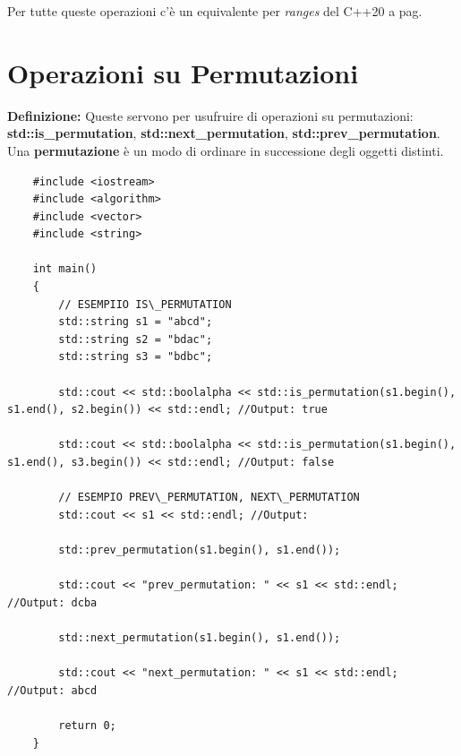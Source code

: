 
\fleuron

\textsf{\small Per tutte queste operazioni c'è un equivalente per \emph{ranges} del C++20 a pag. \pageref{ranges_compare}} \\


\newpage

\section{Operazioni su Permutazioni}

\textsf{\small \textbf{Definizione: } Queste servono per usufruire di operazioni su permutazioni: \textbf{std::is\_permutation}, \textbf{std::next\_permutation}, \textbf{std::prev\_permutation}.} \\

\textsf{\small Una \textbf{permutazione} è un modo di ordinare in successione degli oggetti distinti.} \\

\begin{lstlisting}
	#include <iostream>
	#include <algorithm>
	#include <vector>
	#include <string>
	
	int main()
	{
		// ESEMPIIO IS\_PERMUTATION
		std::string s1 = "abcd";
		std::string s2 = "bdac";
		std::string s3 = "bdbc";
		
		std::cout << std::boolalpha << std::is_permutation(s1.begin(), s1.end(), s2.begin()) << std::endl; //Output: true
		
		std::cout << std::boolalpha << std::is_permutation(s1.begin(), s1.end(), s3.begin()) << std::endl; //Output: false
		
		// ESEMPIO PREV\_PERMUTATION, NEXT\_PERMUTATION
		std::cout << s1 << std::endl; //Output: 
		
		std::prev_permutation(s1.begin(), s1.end());
		
		std::cout << "prev_permutation: " << s1 << std::endl; //Output: dcba
		
		std::next_permutation(s1.begin(), s1.end());
		
		std::cout << "next_permutation: " << s1 << std::endl; //Output: abcd
		
		return 0;
	}
\end{lstlisting}

\fleuron


